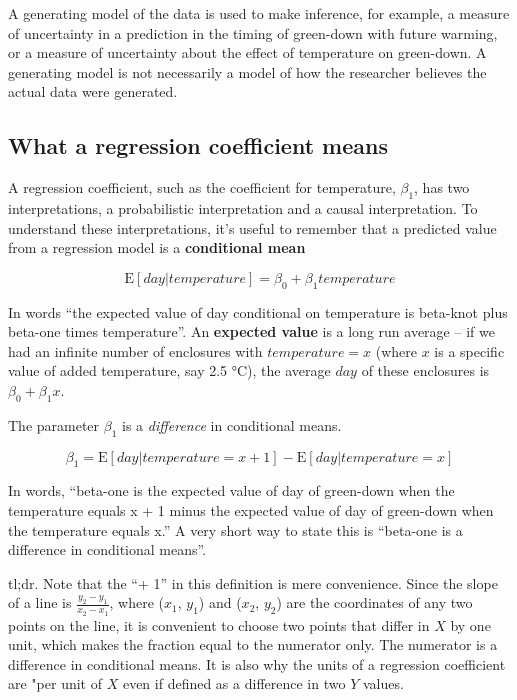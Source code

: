 \documentclass[]{book}
\begin{document}
A generating model of the data is used to make inference, for example, a measure of uncertainty in a prediction in the timing of green-down with future warming, or a measure of uncertainty about the effect of temperature on green-down. A generating model is not necessarily a model of how the researcher believes the actual data were generated.

\hypertarget{what-a-regression-coefficient-means}{%
\subsection{What a regression coefficient means}\label{what-a-regression-coefficient-means}}

A regression coefficient, such as the coefficient for temperature, \(\beta_1\), has two interpretations, a probabilistic interpretation and a causal interpretation. To understand these interpretations, it's useful to remember that a predicted value from a regression model is a \textbf{conditional mean}

\begin{equation}
\textrm{E}[day|temperature] = \beta_0 + \beta_1 temperature
\label{eq:continuous-x-conditional-mean}
\end{equation}

In words ``the expected value of day conditional on temperature is beta-knot plus beta-one times temperature''. An \textbf{expected value} is a long run average -- if we had an infinite number of enclosures with \(temperature=x\) (where \(x\) is a specific value of added temperature, say 2.5 °C), the average \(day\) of these enclosures is \(\beta_0 + \beta_1 x\).

The parameter \(\beta_1\) is a \emph{difference} in conditional means.

\begin{equation}
\beta_1 = \textrm{E}[day|temperature = x+1] - \textrm{E}[day|temperature = x]
\label{eq:beta}
\end{equation}

In words, ``beta-one is the expected value of day of green-down when the temperature equals x + 1 minus the expected value of day of green-down when the temperature equals x.'' A very short way to state this is ``beta-one is a difference in conditional means''.

tl;dr. Note that the ``+ 1'' in this definition is mere convenience. Since the slope of a line is \(\frac{y_2 - y_1}{x_2 - x_1}\), where (\(x_1\), \(y_1\)) and (\(x_2\), \(y_2\)) are the coordinates of any two points on the line, it is convenient to choose two points that differ in \(X\) by one unit, which makes the fraction equal to the numerator only. The numerator is a difference in conditional means. It is also why the units of a regression coefficient are "per unit of \(X\) even if defined as a difference in two \(Y\) values.
\end{document}
